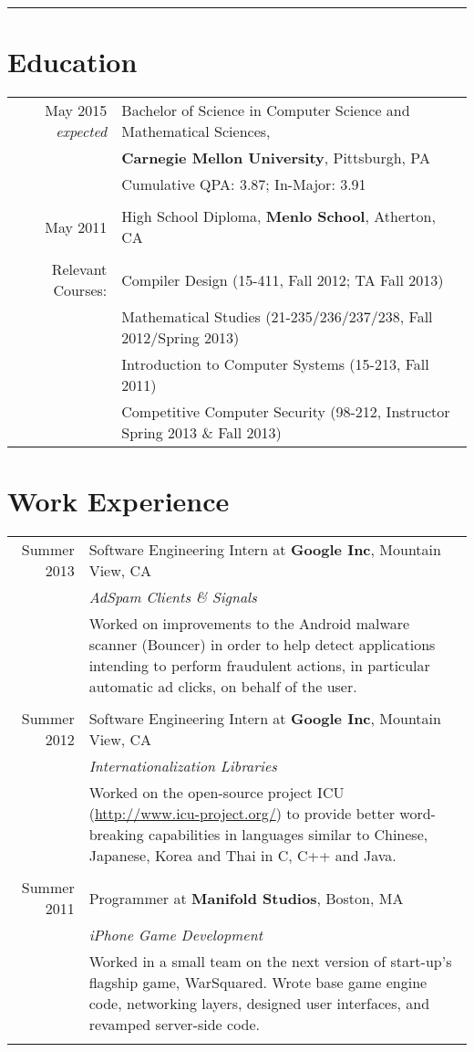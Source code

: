 \documentclass{article}
\newcommand{\job}[6]{#1 & #2 at \textbf{#3}, #4\\ & \emph{#5}\\& \footnotesize{#6}\\
    \multicolumn{2}{c}{}\\ }
\begin{document}
\pagestyle{empty}
\par{\bigskip\par}
\hrule
\par{\par}

\section{Education}
\begin{tabular}{rl}
May 2015 {\em expected} & Bachelor of Science in Computer Science and Mathematical Sciences, 
\\ & \textbf{Carnegie Mellon University}, Pittsburgh, PA\\
& Cumulative QPA: 3.87; In-Major: 3.91 \\ &\\
May 2011 & High School Diploma, \textbf{Menlo School}, Atherton, CA\\ &\\
Relevant Courses: & Compiler Design (15-411, Fall 2012; TA Fall 2013) \\
& Mathematical Studies (21-235/236/237/238, Fall 2012/Spring 2013) \\
& Introduction to Computer Systems (15-213, Fall 2011) \\
& Competitive Computer Security (98-212, Instructor Spring 2013 \& Fall 2013)\end{tabular}

\section{Work Experience}
\begin{tabular}{r|p{}}
\job{Summer 2013}{Software Engineering Intern}{Google Inc}{Mountain View, CA}
{AdSpam Clients \& Signals}
{Worked on improvements to the Android malware scanner (Bouncer) in order to help detect
applications intending to perform fraudulent actions, in particular automatic ad clicks, on behalf
of the user.}
\job{Summer 2012}{Software Engineering Intern}{Google Inc}{Mountain View, CA}
{Internationalization Libraries}
{Worked on the open-source project ICU (\url{http://www.icu-project.org/}) to provide better
word-breaking capabilities in languages similar to Chinese, Japanese, Korea and Thai in C, C++ and
Java.}
\job{Summer 2011}{Programmer}{Manifold Studios}{Boston, MA}{iPhone Game Development}
{Worked in a small team on the next version of start-up's flagship game, WarSquared. Wrote base
game engine code, networking layers, designed user interfaces,
and revamped server-side code.}
\end{tabular}
\end{document}
